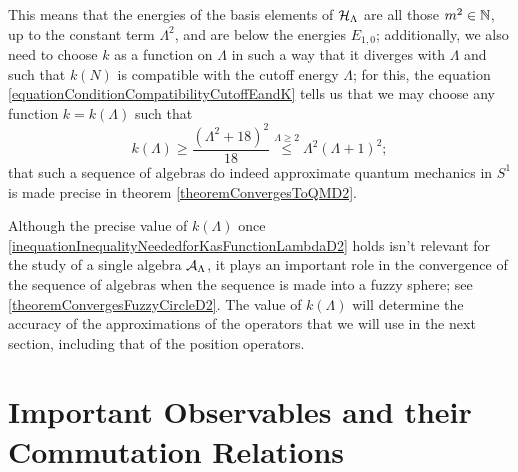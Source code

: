 This means that the energies of the basis elements of $\mathcal H_\Lambda$ are all those $m^2 \in \mathbb{N}$, up to the constant term $\Lambda^2$, and are below the energies $E_{1,0}$; additionally, we also need to choose $k$ as a function on $\Lambda$ in such a way that it diverges with $\Lambda$ and such that $k(N)$ is compatible with the cutoff energy $\Lambda$; for this, the equation \eqref{equationConditionCompatibilityCutoffEandK} tells us that we may choose any function $k = k(\Lambda)$ such that
\begin{equation}\label{inequationInequalityNeededforKasFunctionLambdaD2}
    k(\Lambda) \geq  \frac{\left( {\Lambda^2+18}\right)^2}{18}\overset{\Lambda \geq 2}{\leq} \Lambda^2 (\Lambda + 1)^2;
\end{equation}
that such a sequence of algebras do indeed approximate quantum mechanics in $S^1$ is made precise in theorem \ref{theoremConvergesToQMD2}. 

Although the precise value of $k(\Lambda)$ once \eqref{inequationInequalityNeededforKasFunctionLambdaD2} holds isn't relevant for the study of a single algebra $\mathcal A_\Lambda$, it plays an important role in the convergence of the sequence of algebras when the sequence is made into a fuzzy sphere; see \ref{theoremConvergesFuzzyCircleD2}. The value of $k(\Lambda)$ will determine the accuracy of the approximations of the operators that we will use in the next section, including that of the position operators.%


\section{Important Observables and their Commutation Relations}
\label{chNewFuzzySectionObservables}

    
